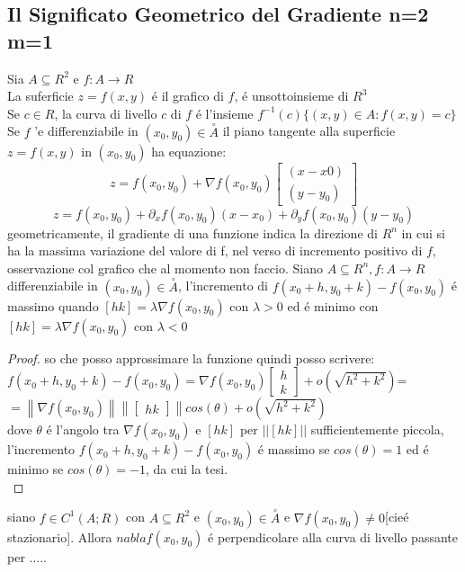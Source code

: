 \subsection{Il Significato Geometrico del Gradiente n=2 m=1}
Sia $A\subseteq R^2$ e $f:A\rightarrow R$\\
La suferficie $z=f(x,y)$ \'e il grafico di $f$, \'e unsottoinsieme di $R^3$\\
Se $c\in R$, la curva di livello $c$ di $f$ \'e l'insieme $f^{-1}(c)\{(x,y)\in A: f(x,y)=c\}$\\
Se $f$ 	'e differenziabile in $(x_0,y_0)\in\overset{\circ}{A}$ il piano tangente alla superficie $z=f(x,y)$ in $(x_0,y_0)$ ha equazione:\\
$$z=f(x_0,y_0)+\nabla f(x_0,y_0)\begin{bmatrix}(x-x0)\\(y-y_0)\end{bmatrix}$$ 
$$z=f(x_0,y_0)+\partial_xf(x_0,y_0)(x-x_0)+\partial_yf(x_0,y_0)(y-y_0)$$
\observation
geometricamente, il gradiente di una funzione indica la direzione di $R^n$ in cui si ha la massima variazione del valore di f, nel verso di incremento positivo di $f$,
\observation 
osservazione col grafico che al momento non faccio.
\proposition
Siano $A\subseteq R^n, f:A\rightarrow R$ differenziabile in $(x_0,y_0)\in \overset{\circ}{A}$, l'incremento di $f(x_0+h,y_0+k)-f(x_0,y_0)$ \'e massimo quando $[h k]=\lambda\nabla f(x_0,y_0)$ con $\lambda >0$ ed \'e minimo con $[h k]=\lambda\nabla f(x_0,y_0)$ con $\lambda <0$
\begin{proof}
	so che posso approssimare la funzione quindi posso scrivere:\\
	$f(x_0+h,y_0+k)-f(x_0,y_0)=\nabla f(x_0,y_0)\begin{bmatrix}h\\k\end{bmatrix}+o(\sqrt{h^2+k^2})$=
	$=\left\| \nabla f(x_0,y_0) \right\|\left\|\begin{bmatrix}h k\end{bmatrix}\right\|cos(\theta)+o(\sqrt{h^2+k^2})$\\
	dove $\theta$ \'e l'angolo tra $\nabla f(x_0,y_0)$ e $[h k]$ per $||[h k]||$ sufficientemente piccola, l'incremento $f(x_0+h,y_0+k)-f(x_0,y_0)$ \'e massimo se $cos( \theta )=1$ ed \'e minimo se $cos(\theta )=-1$, da cui la tesi.\\ 
\end{proof}
\proposition
siano $f\in C^1(A;R)$ con $A\subseteq R^2$ e $(x_0,y_0)\in\overset{\circ}{A}$ e $\nabla f(x_0,y_0)\ne 0$[cie\'e stazionario]. Allora $nabla f(x_0,y_0)$ \'e perpendicolare alla curva di livello passante per .....
